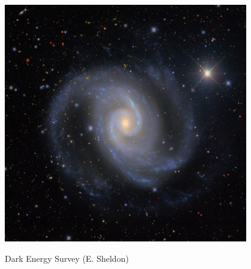 \documentclass{beamer}
\begin{document}
{\begin{columns}
    \end{columns}


}


\frame
{
    \begin{center}
        \includegraphics[width=0.8\textwidth]{DES0421-5457-gri-ngc1566.jpg}
    \end{center}
    {\normalsize Dark Energy Survey (E. Sheldon)}
}
\end{document}
